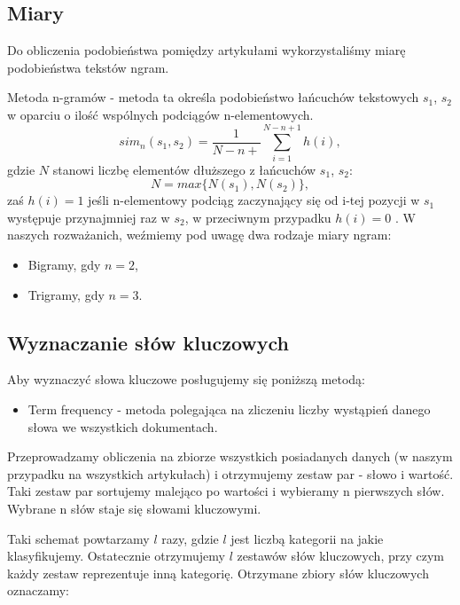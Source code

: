 \documentclass{classrep}
\begin{document}
\subsection{Miary}

Do obliczenia podobieństwa pomiędzy artykułami wykorzystaliśmy miarę podobieństwa tekstów ngram. \newline

Metoda n-gramów - metoda ta określa podobieństwo łańcuchów tekstowych $s_1$, $s_2$ w oparciu o ilość wspólnych podciągów n-elementowych. 
\begin{equation}
sim_{n}(s_1,s_2)= \frac{1}{N-n+}\sum_{i=1}^{N-n+1} h(i),
\end{equation}
gdzie $N$ stanowi liczbę elementów dłuższego z łańcuchów $s_1$, $s_2$:
\begin{equation}
N=max\{N(s_1),N(s_2)\},
\end{equation}
zaś $h(i) = 1$ jeśli n-elementowy podciąg zaczynający się od i-tej pozycji w $s_1$ występuje przynajmniej raz w $s_2$, w przeciwnym przypadku $h(i) = 0$ \cite{wyklad}.
W naszych rozważanich, weźmiemy pod uwagę dwa rodzaje miary ngram:

\begin{itemize}[label=$\bullet$\scshape\bfseries]
\item Bigramy, gdy $n=2$,
\item Trigramy, gdy $n=3$.
\end{itemize}

\subsection{Wyznaczanie słów kluczowych}

Aby wyznaczyć słowa kluczowe posługujemy się poniższą metodą:

\begin{itemize}[label=$\bullet$\scshape\bfseries]
\item Term frequency - metoda polegająca na zliczeniu liczby wystąpień danego słowa we wszystkich dokumentach.
\end{itemize}

Przeprowadzamy obliczenia na zbiorze wszystkich posiadanych danych (w naszym przypadku na wszystkich artykułach) i otrzymujemy zestaw par - słowo i wartość. Taki zestaw par sortujemy malejąco po wartości i wybieramy n pierwszych słów. Wybrane n słów staje się słowami kluczowymi. \newline

Taki schemat powtarzamy $l$ razy, gdzie $l$ jest liczbą kategorii na jakie klasyfikujemy. Ostatecznie otrzymujemy $l$ zestawów słów kluczowych, przy czym każdy zestaw reprezentuje inną kategorię. Otrzymane zbiory słów kluczowych oznaczamy:
\end{document}
